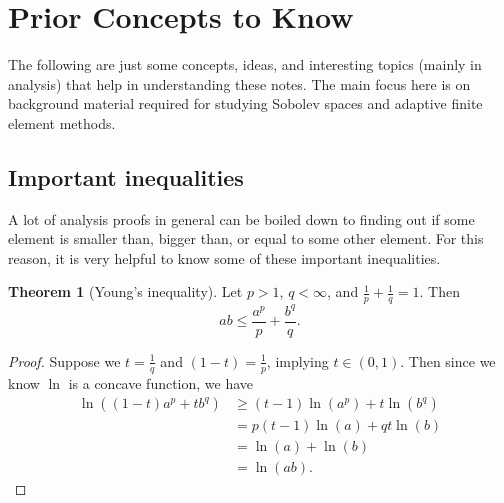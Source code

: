 \documentclass[11pt]{article}
\theoremstyle{definition}
\newtheorem*{theorem}{Theorem}
\begin{document}
\pagestyle{fancy}
\fancyhead[L]{}
\fancyhead[R]{}
\tableofcontents
\newpage
\fancyhead[L]{\leftmark}
\fancyhead[R]{\rightmark}
\fancyhead[C]{}
\section{Prior Concepts to Know}
The following are just some concepts, ideas, and interesting topics (mainly in analysis) that help in understanding these notes.
The main focus here is on background material required for studying Sobolev spaces and adaptive finite element methods.

\newpage

\subsection{Important inequalities}
A lot of analysis proofs in general can be boiled down to finding out if some element is smaller than, bigger than, or equal to some other element.
For this reason, it is very helpful to know some of these important inequalities. 
\begin{theorem}[Young's inequality]
Let $p > 1$, $q < \infty$, and $\frac{1}{p}+\frac{1}{q} = 1$. Then
\[ab \leq \frac{a^p}{p} + \frac{b^q}{q}.\]
\end{theorem}
\begin{proof}
Suppose we $t = \frac{1}{q}$ and $(1-t)=\frac{1}{p}$, implying $t \in (0,1)$. Then since we know $\ln$ is a concave function, we have
	\begin{equation*}
		\begin{aligned}
			\ln{((1-t)a^p + tb^q)} &\geq (t-1)\ln{(a^p)} + t\ln{(b^q)} \\
					       &= p(t-1)\ln{(a)} + qt\ln{(b)} \\
					       &= \ln{(a)} + \ln{(b)} \\
					       &= \ln{(ab)}.
		\end{aligned}
	\end{equation*}
\end{proof}
\end{document}
